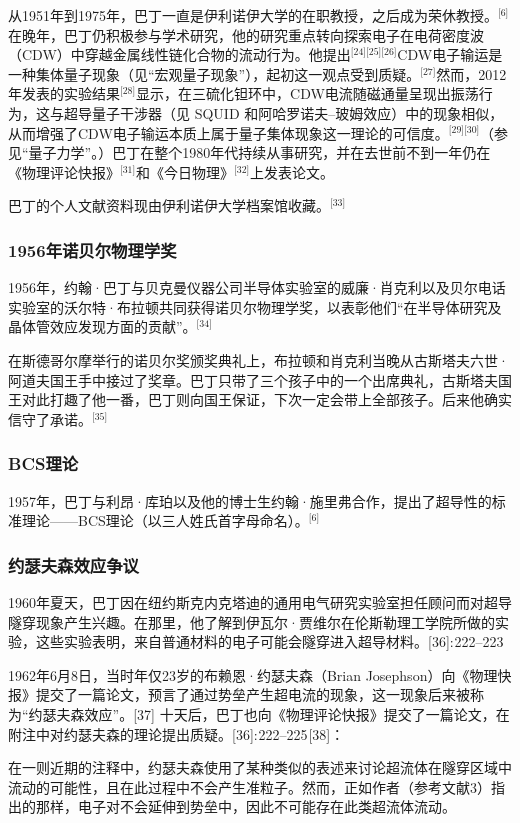 从1951年到1975年，巴丁一直是伊利诺伊大学的在职教授，之后成为荣休教授。\(^\text{[6]}\)在晚年，巴丁仍积极参与学术研究，他的研究重点转向探索电子在电荷密度波（CDW）中穿越金属线性链化合物的流动行为。他提出\(^\text{[24][25][26]}\)CDW电子输运是一种集体量子现象（见“宏观量子现象”），起初这一观点受到质疑。\(^\text{[27]}\)然而，2012年发表的实验结果\(^\text{[28]}\)显示，在三硫化钽环中，CDW电流随磁通量呈现出振荡行为，这与超导量子干涉器（见 SQUID 和阿哈罗诺夫–玻姆效应）中的现象相似，从而增强了CDW电子输运本质上属于量子集体现象这一理论的可信度。\(^\text{[29][30]}\)（参见“量子力学”。）巴丁在整个1980年代持续从事研究，并在去世前不到一年仍在《物理评论快报》\(^\text{[31]}\)和《今日物理》\(^\text{[32]}\)上发表论文。

巴丁的个人文献资料现由伊利诺伊大学档案馆收藏。\(^\text{[33]}\)
\subsubsection{1956年诺贝尔物理学奖}
1956年，约翰·巴丁与贝克曼仪器公司半导体实验室的威廉·肖克利以及贝尔电话实验室的沃尔特·布拉顿共同获得诺贝尔物理学奖，以表彰他们“在半导体研究及晶体管效应发现方面的贡献”。\(^\text{[34]}\)

在斯德哥尔摩举行的诺贝尔奖颁奖典礼上，布拉顿和肖克利当晚从古斯塔夫六世·阿道夫国王手中接过了奖章。巴丁只带了三个孩子中的一个出席典礼，古斯塔夫国王对此打趣了他一番，巴丁则向国王保证，下次一定会带上全部孩子。后来他确实信守了承诺。\(^\text{[35]}\)
\subsubsection{BCS理论}
1957年，巴丁与利昂·库珀以及他的博士生约翰·施里弗合作，提出了超导性的标准理论——BCS理论（以三人姓氏首字母命名）。\(^\text{[6]}\)
\subsubsection{约瑟夫森效应争议}
1960年夏天，巴丁因在纽约斯克内克塔迪的通用电气研究实验室担任顾问而对超导隧穿现象产生兴趣。在那里，他了解到伊瓦尔·贾维尔在伦斯勒理工学院所做的实验，这些实验表明，来自普通材料的电子可能会隧穿进入超导材料。[36]: 222–223 

1962年6月8日，当时年仅23岁的布赖恩·约瑟夫森（Brian Josephson）向《物理快报》提交了一篇论文，预言了通过势垒产生超电流的现象，这一现象后来被称为“约瑟夫森效应”。[37] 十天后，巴丁也向《物理评论快报》提交了一篇论文，在附注中对约瑟夫森的理论提出质疑。[36]: 222–225 [38]：

在一则近期的注释中，约瑟夫森使用了某种类似的表述来讨论超流体在隧穿区域中流动的可能性，且在此过程中不会产生准粒子。然而，正如作者（参考文献3）指出的那样，电子对不会延伸到势垒中，因此不可能存在此类超流体流动。

